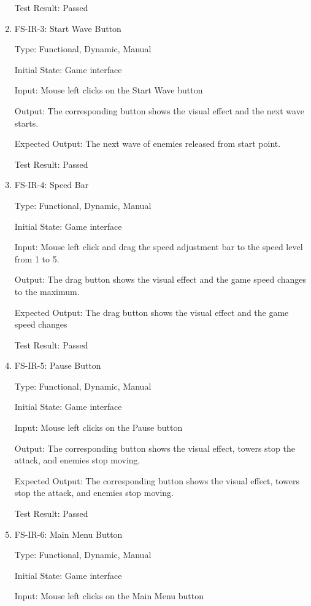\documentclass[12pt]{article}
\begin{document}
\begin{enumerate}
	Test Result: Passed

	
	\item{FS-IR-3: Start Wave Button}
					
	Type: Functional, Dynamic, Manual
					
	Initial State: Game interface
					
	Input: Mouse left clicks on the Start Wave button
					
	Output: The corresponding button shows the visual effect and the next wave starts.
					
	Expected Output: The next wave of enemies released from start point.
	
	Test Result: Passed
					
					
	\item{FS-IR-4: Speed Bar}
					
	Type: Functional, Dynamic, Manual
					
	Initial State: Game interface
					
	Input: Mouse left click and drag the speed adjustment bar to the speed level from 1 to 5.
					
	Output: The drag button shows the visual effect and the game speed changes to the maximum.
					
    Expected Output: The drag button shows the visual effect and the game speed changes
	
	Test Result: Passed
					

	\item{FS-IR-5: Pause Button}

	Type: Functional, Dynamic, Manual

	Initial State: Game interface

	Input:  Mouse left clicks on the Pause button

	Output: The corresponding button shows the visual effect, towers stop the attack, and enemies stop moving.
	
	Expected Output: The corresponding button shows the visual effect, towers stop the attack, and enemies stop moving.
	
	Test Result: Passed
	
	
	
	\item{FS-IR-6: Main Menu Button}
	
    Type: Functional, Dynamic, Manual

	Initial State: Game interface

	Input: Mouse left clicks on the Main Menu button


\end{enumerate}
\end{document}
